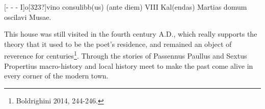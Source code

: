 \documentclass[amsthm,ebook]{saparticle}
\begin{document}
[{}- - - I]o[323?]vino consulibb(us) (ante diem) VIII Kal(endas) Martias domum oscilavi Musae. 

This house was still visited in the fourth century A.D., which really supports the theory that it used to be the poet’s
residence, and remained an object of reverence for centuries\footnote{ Boldrighini 2014, 244-246.}. Through the stories
of Passennus Paullus and Sextus Propertius macro-history and local history meet to make the past come alive in every
corner of the modern town.



\end{document}
